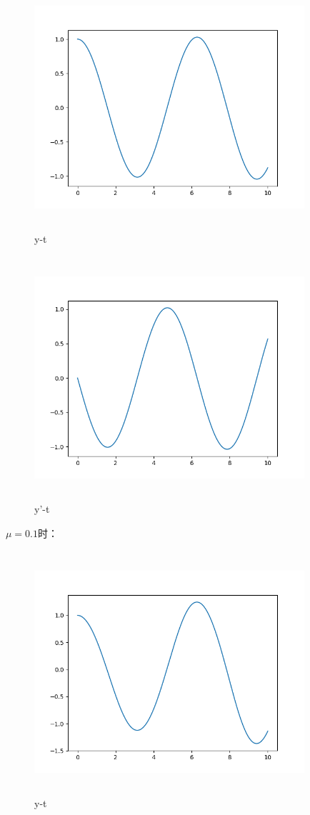 \documentclass[UTF8]{ctexart}
\begin{document}
\begin{figure}[H]
 \centering
  \includegraphics[width=10cm,height=9cm]{6-001-01.png}
  \caption{y-t}
\end{figure}

\begin{figure}[H]
 \centering
  \includegraphics[width=10cm,height=9cm]{6-001-02.png}
  \caption{y'-t}
\end{figure}


$ \mu =0.1 $时：

\begin{figure}[H]
 \centering
  \includegraphics[width=10cm,height=9cm]{6-01-01.png}
  \caption{y-t}
\end{figure}
\end{document}
